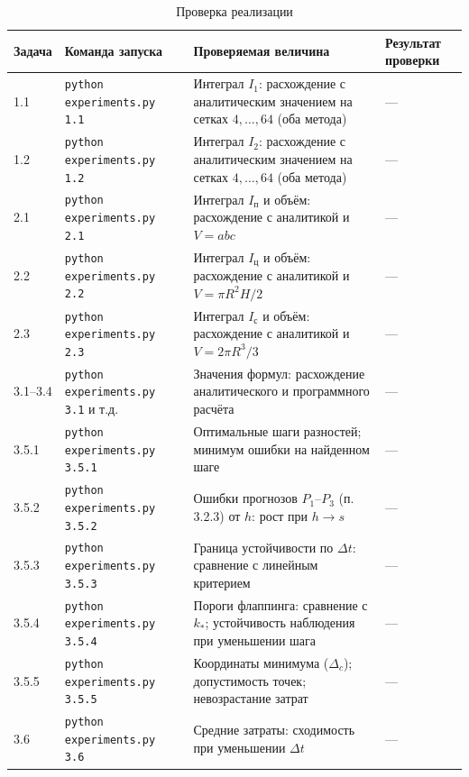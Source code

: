 %

\begin{table}[htbp]
\centering\small
\caption{Проверка реализации}
\label{tab:checks}
\begin{tabular}{|p{1.4cm}|p{3.9cm}|p{4.6cm}|p{4.6cm}|}\hline
Задача & Команда запуска & Проверяемая величина & Результат проверки\\\hline
1.1 & \texttt{python experiments.py 1.1} & Интеграл $I_1$: расхождение с аналитическим значением на сетках $4,\dots,64$ (оба метода) & —\\\hline
1.2 & \texttt{python experiments.py 1.2} & Интеграл $I_2$: расхождение с аналитическим значением на сетках $4,\dots,64$ (оба метода) & —\\\hline
2.1 & \texttt{python experiments.py 2.1} & Интеграл $I_{\mathrm{п}}$ и объём: расхождение с аналитикой и $V=abc$ & —\\\hline
2.2 & \texttt{python experiments.py 2.2} & Интеграл $I_{\mathrm{ц}}$ и объём: расхождение с аналитикой и $V=\pi R^2H/2$ & —\\\hline
2.3 & \texttt{python experiments.py 2.3} & Интеграл $I_{\mathrm{с}}$ и объём: расхождение с аналитикой и $V=2\pi R^3/3$ & —\\\hline
3.1–3.4 & \texttt{python experiments.py 3.1} и т.д. & Значения формул: расхождение аналитического и программного расчёта & —\\\hline
3.5.1 & \texttt{python experiments.py 3.5.1} & Оптимальные шаги разностей; минимум ошибки на найденном шаге & —\\\hline
3.5.2 & \texttt{python experiments.py 3.5.2} & Ошибки прогнозов $P_1$–$P_3$ (п. 3.2.3) от $h$: рост при $h\to s$ & —\\\hline
3.5.3 & \texttt{python experiments.py 3.5.3} & Граница устойчивости по $\Delta t$: сравнение с линейным критерием & —\\\hline
3.5.4 & \texttt{python experiments.py 3.5.4} & Пороги флаппинга: сравнение с $k_*$; устойчивость наблюдения при уменьшении шага & —\\\hline
3.5.5 & \texttt{python experiments.py 3.5.5} & Координаты минимума ($\Delta_c$); допустимость точек; невозрастание затрат & —\\\hline
3.6 & \texttt{python experiments.py 3.6} & Средние затраты: сходимость при уменьшении $\Delta t$ & —\\\hline
\end{tabular}
\end{table}
